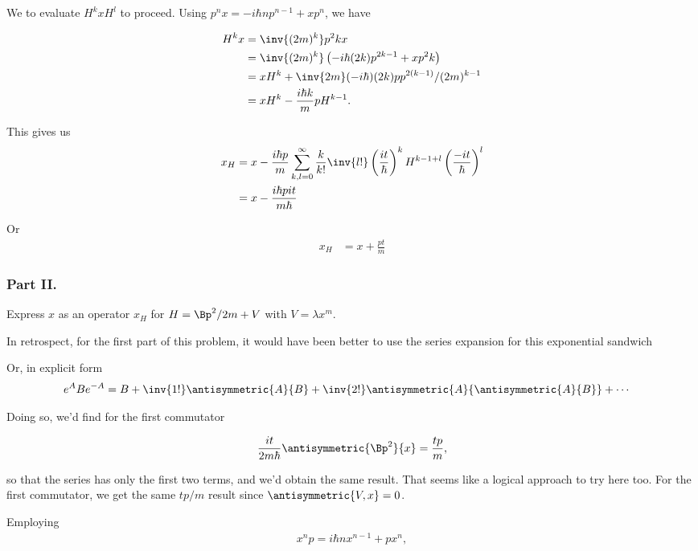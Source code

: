 We to evaluate $H^k x H^l$ to proceed.  Using $p^n x = -i \hbar n p^{n-1} + x p^n$, we have

\begin{align*}
H^k x 
&= \inv{(2m)^k} p^2k x \\
&= \inv{(2m)^k} \left( -i \hbar (2k) p^{2k -1} + x p^2k \right) \\
&= x H^k + \inv{2m} (-i \hbar) (2k) p p^{2(k-1)}/(2m)^{k-1} \\
&= x H^k - \frac{i \hbar k}{m} p H^{k-1}.
\end{align*}

This gives us
\begin{align*}
x_H 
&= x - \frac{i \hbar p }{m} \sum_{k,l=0}^\infty \frac{k}{k!} \inv{l!}
\left(\frac{i t}{\hbar}\right)^k H^{k-1 + l}
\left(\frac{-i t}{\hbar}\right)^l  \\
&= x - \frac{i \hbar p i t }{m \hbar} 
\end{align*}

Or
\begin{align}\label{eqn:desaiCh3:303}
x_H 
&= x + \frac{p t }{m} 
\end{align}


\subsubsection{Part II.}
Express $x$ as an operator $x_H$ for $H = \Bp^2/2m + V$ with $V = \lambda x^m$.

In retrospect, for the first part of this problem, it would have been better to use the series expansion for this exponential sandwich

Or, in explicit form
\begin{align}\label{eqn:desaiCh3:304}
e^A B e^{-A}
&=
B 
+ \inv{1!} \antisymmetric{A}{B}
+ \inv{2!} 
\antisymmetric{A}{\antisymmetric{A}{B}}
+ \cdots
\end{align}

Doing so, we'd find for the first commutator

\begin{align}\label{eqn:desaiCh3:305}
\frac{i t}{2m \hbar} \antisymmetric{\Bp^2}{x} = \frac{t p}{m},
\end{align}

so that the series has only the first two terms, and we'd obtain the same result.  That seems like a logical approach to try here too.  For the first commutator, we get the same $tp/m$ result since $\antisymmetric{V,x} = 0$.

Employing 
\begin{align}\label{eqn:desaiCh3:306}
x^n p = i \hbar n x^{n-1} + p x^n,
\end{align}


